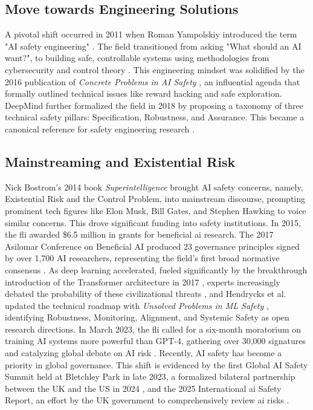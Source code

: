 	\subsection*{Move towards Engineering Solutions}

	A pivotal shift occurred in 2011 when Roman Yampolskiy introduced the term "AI safety engineering" \cite{yampolskiy2013, yampolskiy_controllability_2022}. The field transitioned from asking "What should an AI want?", to building safe, controllable systems using methodologies from cybersecurity and control theory \cite{control_theory_safety}. This engineering mindset was solidified by the 2016 publication of \textit{Concrete Problems in AI Safety} \cite{amodei2016concrete}, an influential agenda that formally outlined technical issues like reward hacking and safe exploration. DeepMind further formalized the field in 2018 by proposing a taxonomy of three technical safety pillars: Specification, Robustness, and Assurance. This became a canonical reference for safety engineering research \cite{ortega2018building}.

	\subsection*{Mainstreaming and Existential Risk}

	Nick Bostrom's 2014 book \textit{Superintelligence} \cite{bostrom2014superintelligence} brought AI safety concerns, namely,  Existential Risk and the Control Problem, into mainstream discourse, prompting prominent tech figures like Elon Musk, Bill Gates, and Stephen Hawking to voice similar concerns. This drove significant funding into safety institutions. In 2015, the \gls{fli} awarded \$6.5 million in grants for beneficial \gls{ai} research. The 2017 Asilomar Conference on Beneficial AI produced 23 governance principles signed by over 1,700 AI researchers, representing the field's first broad normative consensus \cite{futureoflife2017asilomar}. As deep learning accelerated, fueled significantly by the breakthrough introduction of the Transformer architecture in 2017 \cite{vaswani2017attention}, experts increasingly debated the probability of these civilizational threats \cite{field_why_2025}, and Hendrycks et al. updated the technical roadmap with \textit{Unsolved Problems in ML Safety} \cite{hendrycks2021unsolved}, identifying Robustness, Monitoring, Alignment, and Systemic Safety as open research directions. In March 2023, the \gls{fli} called for a six-month moratorium on training AI systems more powerful than GPT-4, gathering over 30,000 signatures and catalyzing global debate on AI risk \cite{futureoflife2023pause}. Recently, AI safety has become a priority in global governance. This shift is evidenced by the first Global AI Safety Summit held at Bletchley Park in late 2023, a formalized bilateral partnership between the UK and the US in 2024 \cite{ukus2024mou}, and the 2025 International \gls{ai} Safety Report, an effort by the UK government to comprehensively review \gls{ai} risks \cite{AISafetyReport2025}.

